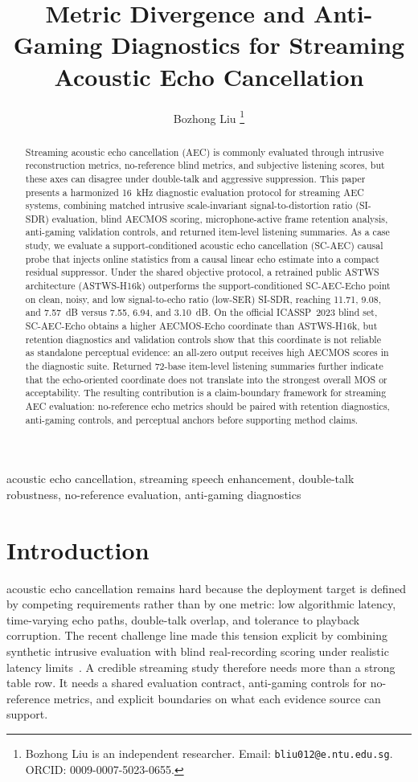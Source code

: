 \documentclass[journal]{IEEEtran}
\title{Metric Divergence and Anti-Gaming Diagnostics for Streaming Acoustic Echo Cancellation}
\author{Bozhong Liu%
\thanks{Bozhong Liu is an independent researcher. Email: \texttt{bliu012@e.ntu.edu.sg}. ORCID: 0009-0007-5023-0655.}}
\begin{document}
\maketitle

\begin{abstract}
Streaming acoustic echo cancellation (AEC) is commonly evaluated through intrusive reconstruction metrics, no-reference blind metrics, and subjective listening scores, but these axes can disagree under double-talk and aggressive suppression. This paper presents a harmonized 16~kHz diagnostic evaluation protocol for streaming AEC systems, combining matched intrusive scale-invariant signal-to-distortion ratio (SI-SDR) evaluation, blind AECMOS scoring, microphone-active frame retention analysis, anti-gaming validation controls, and returned item-level listening summaries. As a case study, we evaluate a support-conditioned acoustic echo cancellation (SC-AEC) causal probe that injects online statistics from a causal linear echo estimate into a compact residual suppressor. Under the shared objective protocol, a retrained public ASTWS architecture (ASTWS-H16k) outperforms the support-conditioned SC-AEC-Echo point on clean, noisy, and low signal-to-echo ratio (low-SER) SI-SDR, reaching 11.71, 9.08, and 7.57~dB versus 7.55, 6.94, and 3.10~dB. On the official ICASSP~2023 blind set, SC-AEC-Echo obtains a higher AECMOS-Echo coordinate than ASTWS-H16k, but retention diagnostics and validation controls show that this coordinate is not reliable as standalone perceptual evidence: an all-zero output receives high AECMOS scores in the diagnostic suite. Returned 72-base item-level listening summaries further indicate that the echo-oriented coordinate does not translate into the strongest overall MOS or acceptability. The resulting contribution is a claim-boundary framework for streaming AEC evaluation: no-reference echo metrics should be paired with retention diagnostics, anti-gaming controls, and perceptual anchors before supporting method claims.
\end{abstract}

\begin{IEEEkeywords}
acoustic echo cancellation, streaming speech enhancement, double-talk robustness, no-reference evaluation, anti-gaming diagnostics
\end{IEEEkeywords}

\section{Introduction}
 acoustic echo cancellation remains hard because the deployment target is defined by competing requirements rather than by one metric: low algorithmic latency, time-varying echo paths, double-talk overlap, and tolerance to playback corruption. The recent challenge line made this tension explicit by combining synthetic intrusive evaluation with blind real-recording scoring under realistic latency limits~\cite{cutler2021aec,cutler2022aec,cutler2024aec}. A credible streaming study therefore needs more than a strong table row. It needs a shared evaluation contract, anti-gaming controls for no-reference metrics, and explicit boundaries on what each evidence source can support.
\end{document}
